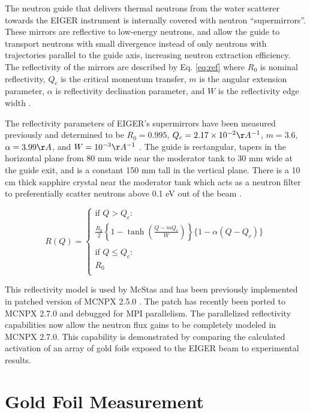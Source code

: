 \documentclass[a4paper,
              ]{jacow}
\begin{document}
The neutron guide that delivers thermal neutrons from the water scatterer towards the EIGER instrument is internally covered with neutron ``supermirrors''.  These mirrors are reflective to low-energy neutrons, and allow the guide to transport neutrons with small divergence instead of only neutrons with trajectories parallel to the guide axis, increasing neutron extraction efficiency.  The reflectivity of the mirrors are described by Eq. \ref{eq:ref} where $R_0$ is nominal reflectivity, $Q_c$ is the critical momentum transfer, $m$ is the angular extension parameter, $\alpha$ is reflectivity declination parameter, and $W$ is the reflectivity edge width \cite{mcnpx-ref}.

The reflectivity parameters of EIGER's supermirrors have been measured previously and determined to be $R_0=0.995$, $Q_c=2.17\times10^{-2}\AA^{-1}$, $m=3.6$, $\alpha=3.99 \AA$, and $W=10^{-3} \AA^{-1}$ \cite{eiger-uwe}.  The guide is rectangular, tapers in the horizontal plane from 80 mm wide near the moderator tank to 30 mm wide at the guide exit, and is a constant 150 mm tall in the vertical plane.  There is a 10 cm thick sapphire crystal near the moderator tank which acts as a neutron filter to preferentially scatter neutrons above 0.1 eV out of the beam \cite{freund}.

\begin{equation}\label{eq:ref}
R(Q) = 
\begin{cases}
    \mbox{if } Q > Q_c : \\
    \frac{R_0}{2}\left\{  1 - \tanh\left(  \frac{Q - m Q_c}{W}\right) \right\}\{1-\alpha(Q-Q_c)\} \\
    \\
    \mbox{if } Q \leq Q_c :\\
    R_0 \\
\end{cases}
\end{equation}

This reflectivity model is used by McStas and has been previously implemented in patched version of MCNPX 2.5.0 \cite{mcnpx-ref}.  The patch has recently been ported to MCNPX 2.7.0 \cite{mcnpx270} and debugged for MPI parallelism.  The parallelized reflectivity capabilities now allow the neutron flux gains to be completely modeled in MCNPX 2.7.0.  This capability is demonstrated by comparing the calculated activation of an array of gold foils exposed to the EIGER beam to experimental results.

\section{Gold Foil Measurement}
\end{document}

